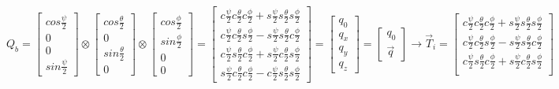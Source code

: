 {\begin{subequations}
\begin{equation}
Q_b=\begin{bmatrix}
cos\frac{\psi}{2}\\
0\\
0\\
sin\frac{\psi}{2}
\end{bmatrix}
\otimes
\begin{bmatrix}
cos\frac{\theta}{2}\\
0\\
sin\frac{\theta}{2}\\
0
\end{bmatrix}
\otimes
\begin{bmatrix}
cos\frac{\phi}{2}\\
sin\frac{\phi}{2}\\
0\\
0
\end{bmatrix}
\end{equation}
\begin{equation}
=
\begin{bmatrix}
c\frac{\psi}{2}c\frac{\theta}{2}c\frac{\phi}{2}+s\frac{\psi}{2}s\frac{\theta}{2}s\frac{\phi}{2}\\
c\frac{\psi}{2}c\frac{\theta}{2}s\frac{\phi}{2}-s\frac{\psi}{2}s\frac{\theta}{2}c\frac{\phi}{2}\\
c\frac{\psi}{2}s\frac{\theta}{2}c\frac{\phi}{2}+s\frac{\psi}{2}c\frac{\theta}{2}s\frac{\phi}{2}\\
s\frac{\psi}{2}c\frac{\theta}{2}c\frac{\phi}{2}-c\frac{\psi}{2}s\frac{\theta}{2}s\frac{\phi}{2}
\end{bmatrix}
=
\begin{bmatrix}
q_0\\
q_x\\
q_y\\
q_z
\end{bmatrix}
=
\begin{bmatrix}
q_0\\
\vec{q}
\end{bmatrix}
\end{equation}
\begin{equation}
\rightarrow\vec{T}_i=
\begin{bmatrix}
c\frac{\psi}{2}c\frac{\theta}{2}c\frac{\phi}{2}+s\frac{\psi}{2}s\frac{\theta}{2}s\frac{\phi}{2}\\
c\frac{\psi}{2}c\frac{\theta}{2}s\frac{\phi}{2}-s\frac{\psi}{2}s\frac{\theta}{2}c\frac{\phi}{2}\\
c\frac{\psi}{2}s\frac{\theta}{2}c\frac{\phi}{2}+s\frac{\psi}{2}c\frac{\theta}{2}s\frac{\phi}{2}\\

\end{bmatrix}
\end{equation}
\end{subequations}}
